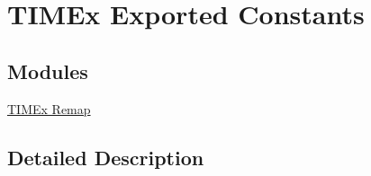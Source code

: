 \hypertarget{group___t_i_m_ex___exported___constants}{\section{T\-I\-M\-Ex Exported Constants}
\label{group___t_i_m_ex___exported___constants}
}
\subsection*{Modules}
\begin{DoxyCompactItemize}
\item 
\hyperlink{group___t_i_m_ex___remap}{T\-I\-M\-Ex Remap}
\end{DoxyCompactItemize}


\subsection{Detailed Description}
